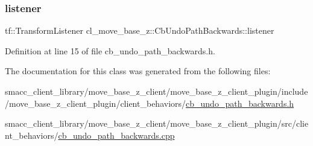 \subsubsection{\texorpdfstring{listener}{listener}}
{\footnotesize\ttfamily tf\+::\+Transform\+Listener cl\+\_\+move\+\_\+base\+\_\+z\+::\+Cb\+Undo\+Path\+Backwards\+::listener\hspace{0.3cm}{\ttfamily [private]}}



Definition at line 15 of file cb\+\_\+undo\+\_\+path\+\_\+backwards.\+h.



The documentation for this class was generated from the following files\+:\begin{DoxyCompactItemize}
\item 
smacc\+\_\+client\+\_\+library/move\+\_\+base\+\_\+z\+\_\+client/move\+\_\+base\+\_\+z\+\_\+client\+\_\+plugin/include/move\+\_\+base\+\_\+z\+\_\+client\+\_\+plugin/client\+\_\+behaviors/\hyperlink{cb__undo__path__backwards_8h}{cb\+\_\+undo\+\_\+path\+\_\+backwards.\+h}\item 
smacc\+\_\+client\+\_\+library/move\+\_\+base\+\_\+z\+\_\+client/move\+\_\+base\+\_\+z\+\_\+client\+\_\+plugin/src/client\+\_\+behaviors/\hyperlink{cb__undo__path__backwards_8cpp}{cb\+\_\+undo\+\_\+path\+\_\+backwards.\+cpp}\end{DoxyCompactItemize}
